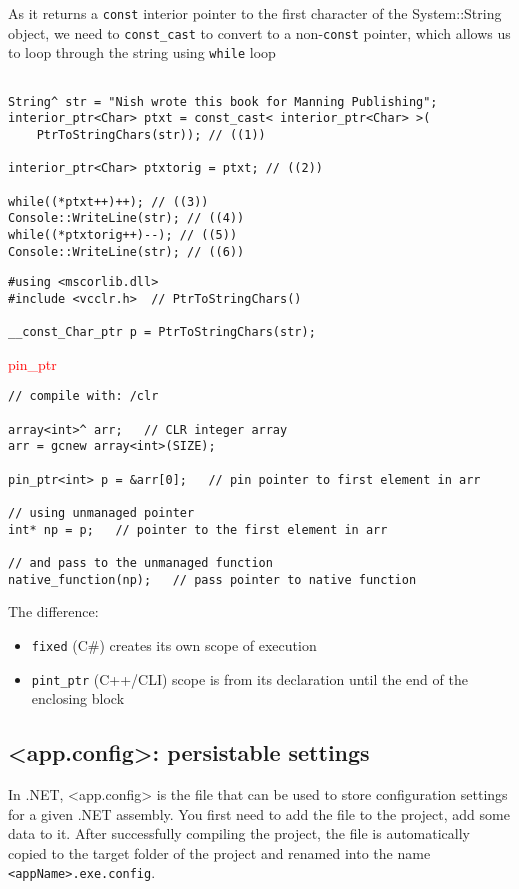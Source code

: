 As it returns a \verb!const! interior pointer to the first character of the
System::String object, we need to \verb!const_cast! to convert to a
non-\verb!const! pointer, which allows us to loop through the string using
\verb!while! loop

\begin{Verbatim}

String^ str = "Nish wrote this book for Manning Publishing";
interior_ptr<Char> ptxt = const_cast< interior_ptr<Char> >(
    PtrToStringChars(str)); // ((1))

interior_ptr<Char> ptxtorig = ptxt; // ((2))

while((*ptxt++)++); // ((3))
Console::WriteLine(str); // ((4))
while((*ptxtorig++)--); // ((5))
Console::WriteLine(str); // ((6))    
\end{Verbatim}

\begin{verbatim}
#using <mscorlib.dll>
#include <vcclr.h>  // PtrToStringChars()

__const_Char_ptr p = PtrToStringChars(str);
\end{verbatim}

\textcolor{red}{pin\_ptr}
\begin{verbatim}
// compile with: /clr 

array<int>^ arr;   // CLR integer array
arr = gcnew array<int>(SIZE);

pin_ptr<int> p = &arr[0];   // pin pointer to first element in arr

// using unmanaged pointer 
int* np = p;   // pointer to the first element in arr

// and pass to the unmanaged function
native_function(np);   // pass pointer to native function
\end{verbatim} 

The difference:
\begin{itemize}
  \item \verb!fixed! (C\#) creates its own scope of execution
  
  \item \verb!pint_ptr! (C++/CLI) scope is from its declaration until the end of the enclosing block
\end{itemize}

\subsection{<app.config>: persistable settings}

In .NET, <app.config> is the file that can be used to store configuration
settings for a given .NET assembly. You first need to add the file to the
project, add some data to it. After successfully compiling the project, the file
is automatically copied to the target folder of the project and renamed into the
name \verb!<appName>.exe.config!.

